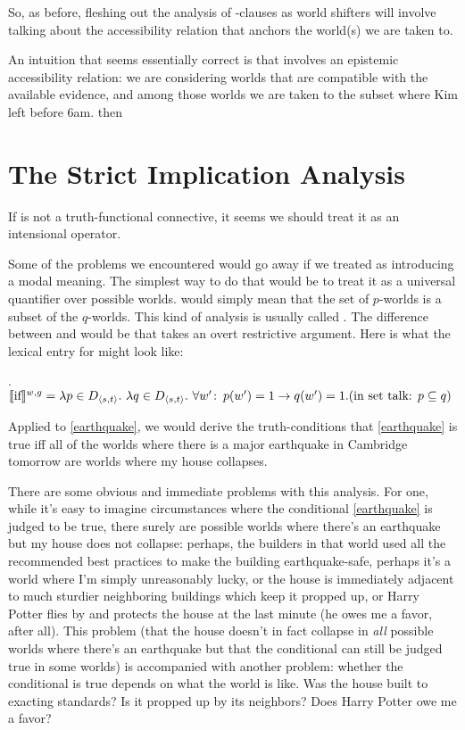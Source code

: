 So, as before, fleshing out the analysis of -clauses as world
shifters will involve talking about the accessibility relation that anchors the
world(s) we are taken to.

An intuition that seems essentially correct is that \Last[a] involves an
epistemic accessibility relation: we are considering worlds that are compatible
with the available evidence, and among those worlds we are taken to the subset
where Kim left before 6am. \Last[a] then 

\section{The Strict Implication Analysis}

If  is not a truth-functional connective, it seems we should
treat it as an intensional operator. 

Some of the problems we encountered would go away if we treated  as introducing a modal meaning. The simplest way to do that would be to treat it as a universal quantifier over possible worlds.  would simply mean that the set of $p$-worlds is a subset of the $q$-worlds. This kind of analysis is usually called . The difference between  and  would be that  takes an overt restrictive argument. Here is what the lexical entry for  might look like:

\ex. $\llbracket \mbox{if} \rrbracket^{w,g} = \lambda p \in D_{\langle s,t \rangle}.\ \lambda q \in D_{\langle s,t \rangle}.\ \forall w'\colon\thinspace p(w')=1 \rightarrow q(w')=1.\\[6pt]
(\mbox{in set talk: } p \subseteq q)$

Applied to \ref{earthquake}, we would derive the truth-conditions that \ref{earthquake} is true iff all of the worlds where there is a major earthquake in Cambridge tomorrow are worlds where my house collapses.

There are some obvious and immediate problems with this analysis. For one, while
it's easy to imagine circumstances where the conditional \ref{earthquake} is
judged to be true, there surely are possible worlds where there's an earthquake
but my house does not collapse: perhaps, the builders in that world used all the
recommended best practices to make the building earthquake-safe, perhaps it's a
world where I'm simply unreasonably lucky, or the house is immediately adjacent
to much sturdier neighboring buildings which keep it propped up, or Harry Potter
flies by and protects the house at the last minute (he owes me a favor, after
all). This problem (that the house doesn't in fact collapse in \emph{all}
possible worlds where there's an earthquake but that the conditional can still
be judged true in some worlds) is accompanied with another problem: whether the
conditional is true depends on what the world is like. Was the house built to
exacting standards? Is it propped up by its neighbors? Does Harry Potter owe me
a favor?

